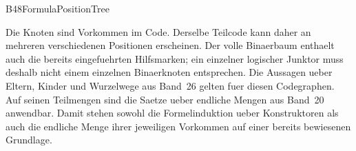 {B48FormulaPositionTree}{}
\begin{tabproofwide}
\end{tabproofwide}

Die Knoten sind Vorkommen im Code. Derselbe Teilcode kann daher an
mehreren verschiedenen Positionen erscheinen. Der volle Binaerbaum
enthaelt auch die bereits eingefuehrten Hilfsmarken; ein einzelner
logischer Junktor muss deshalb nicht einem einzelnen Binaerknoten
entsprechen. Die Aussagen ueber Eltern, Kinder und Wurzelwege aus
Band~26 gelten fuer diesen Codegraphen. Auf seinen Teilmengen sind
die Saetze ueber endliche Mengen aus Band~20 anwendbar. Damit stehen
sowohl die Formelinduktion ueber Konstruktoren als auch die endliche
Menge ihrer jeweiligen Vorkommen auf einer bereits bewiesenen Grundlage.
